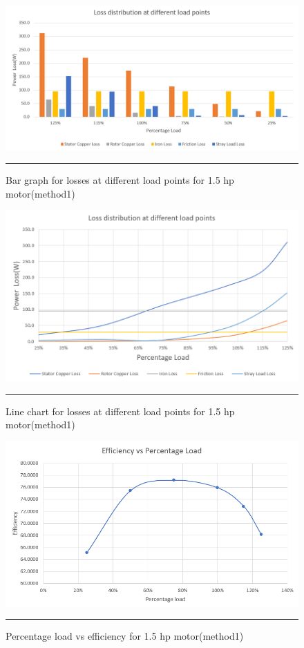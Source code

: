 \begin{figure}[hbtp!]
	\centering
		\includegraphics[width = 4.5in]{./Figures/MS/fig515.png}
		\rule{35em}{0.5pt}
	\caption{Bar graph for losses at different load points for 1.5 hp motor(method1)}
	\label{fig:Bar graph for losses at different load points for 1.5 hp motor(method1)} 
\end{figure}

\begin{figure}[hbtp!]
	\centering
		\includegraphics[width = 4.5in]{./Figures/MS/fig516.png}
		\rule{35em}{0.5pt}
	\caption{Line chart for losses at different load points for 1.5 hp motor(method1)}
	\label{fig:Line chart for losses at different load points for 1.5 hp motor(method1)} 
\end{figure}

\begin{figure}[hbtp!]
	\centering
		\includegraphics[width = 4.5in]{./Figures/MS/fig517.png}
		\rule{35em}{0.5pt}
	\caption{Percentage load vs efficiency for 1.5 hp motor(method1)}
	\label{fig:Percentage load vs efficiency for 1.5 hp motor(method1)} 
\end{figure}

